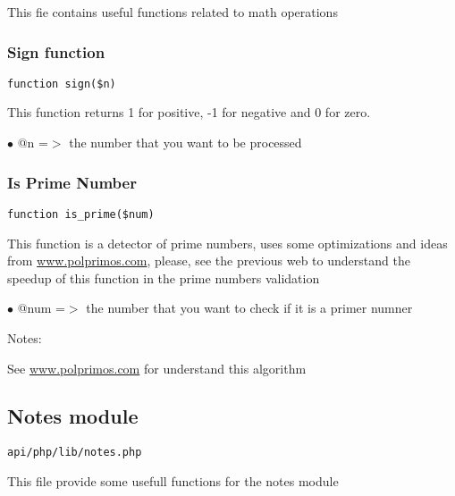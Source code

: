 \documentclass[a4paper]{article}
\def\htmladdnormallink#1#2{\href{#2}{#1}}
\begin{document}
This fie contains useful functions related to math operations

\hypertarget{toc494}{}
\subsubsection{Sign function}

\begin{lstlisting}
function sign($n)
\end{lstlisting}

This function returns 1 for positive, -1 for negative and 0 for zero.

\begin{compactitem}
\item[\color{myblue}$\bullet$] @n =$>$ the number that you want to be processed
\end{compactitem}

\hypertarget{toc495}{}
\subsubsection{Is Prime Number}

\begin{lstlisting}
function is_prime($num)
\end{lstlisting}

This function is a detector of prime numbers, uses some optimizations and
ideas from \htmladdnormallink{www.polprimos.com}{www.polprimos.com}, please, see the previous web to understand
the speedup of this function in the prime numbers validation

\begin{compactitem}
\item[\color{myblue}$\bullet$] @num =$>$ the number that you want to check if it is a primer numner
\end{compactitem}

Notes:

See \htmladdnormallink{www.polprimos.com}{www.polprimos.com} for understand this algorithm

\hypertarget{toc496}{}
\subsection{Notes module}

\begin{lstlisting}
api/php/lib/notes.php
\end{lstlisting}

This file provide some usefull functions for the notes module
\end{document}
